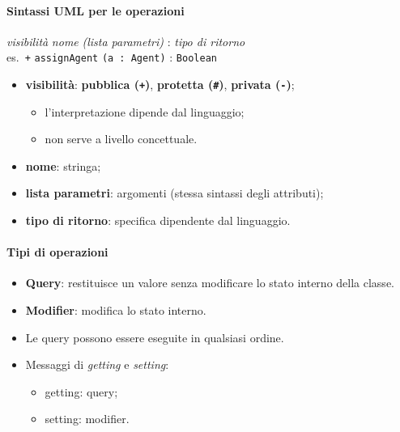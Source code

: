 \documentclass[a4paper,12pt]{article}
\begin{document}
\paragraph{Sintassi UML per le operazioni}
\begin{center}
  {\color{opVis}\textit{visibilità}} {\color{opName}\textit{nome}}
  {\color{opPar}\textit{(lista parametri)}} : {\color{opRet}\textit{tipo di ritorno}}\\[0.5ex]
  es.\ {\color{opVis}\texttt{+}} {\color{opName}\texttt{assignAgent}}
  {\color{opPar}\texttt{(a : Agent)}} : {\color{opRet}\texttt{Boolean}}
\end{center}
\begin{itemize}
  \item {\color{opVis}\textbf{visibilità}}: {\color{opPub}\textbf{pubblica (\texttt{+})}},
        {\color{opProt}\textbf{protetta (\texttt{\#})}},
        {\color{opVis}\textbf{privata (\texttt{-})}};
  \begin{itemize}
    \item l'interpretazione dipende dal linguaggio;
    \item non serve a livello concettuale.
  \end{itemize}
  \item {\color{opName}\textbf{nome}}: stringa;
  \item {\color{opPar}\textbf{lista parametri}}: argomenti (stessa sintassi degli attributi);
  \item {\color{opRet}\textbf{tipo di ritorno}}: specifica dipendente dal linguaggio.
\end{itemize}
\paragraph{Tipi di operazioni}
\begin{itemize}
  \item \textbf{Query}: restituisce un valore senza modificare lo stato interno della
        classe.
  \item \textbf{Modifier}: modifica lo stato interno.
  \item Le query possono essere eseguite in qualsiasi ordine.
  \item Messaggi di \emph{getting} e \emph{setting}:
  \begin{itemize}
    \item getting: query;
    \item setting: modifier.
  \end{itemize}
\end{itemize}
\end{document}
